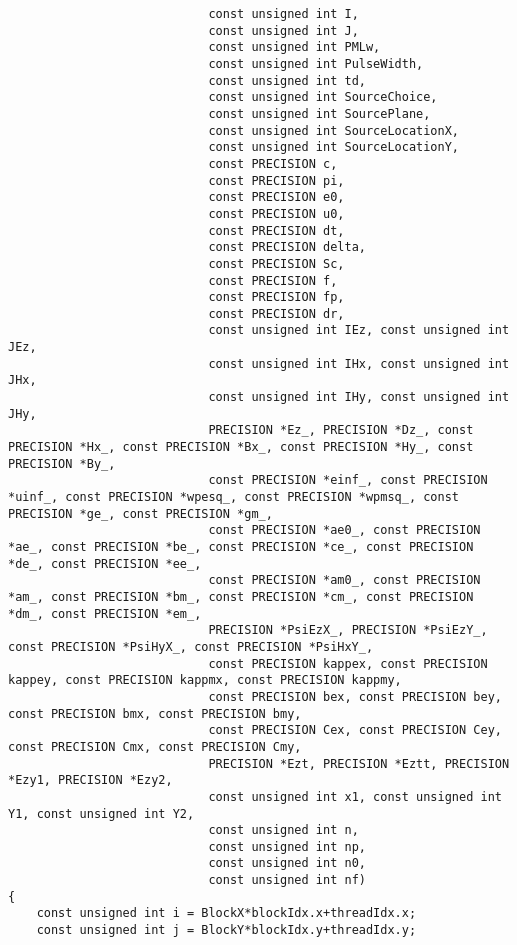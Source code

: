 \begin{lstlisting}
							const unsigned int I,
							const unsigned int J,
							const unsigned int PMLw,
							const unsigned int PulseWidth,
							const unsigned int td,
							const unsigned int SourceChoice,
							const unsigned int SourcePlane,
							const unsigned int SourceLocationX,
							const unsigned int SourceLocationY,
							const PRECISION c,
							const PRECISION pi,
							const PRECISION e0,
							const PRECISION u0,
							const PRECISION dt,
							const PRECISION delta,
							const PRECISION Sc,
							const PRECISION f,
							const PRECISION fp,
							const PRECISION dr,
							const unsigned int IEz, const unsigned int JEz,
							const unsigned int IHx, const unsigned int JHx,
							const unsigned int IHy, const unsigned int JHy,
							PRECISION *Ez_, PRECISION *Dz_, const PRECISION *Hx_, const PRECISION *Bx_, const PRECISION *Hy_, const PRECISION *By_,
							const PRECISION *einf_, const PRECISION *uinf_, const PRECISION *wpesq_, const PRECISION *wpmsq_, const PRECISION *ge_, const PRECISION *gm_,
							const PRECISION *ae0_, const PRECISION *ae_, const PRECISION *be_, const PRECISION *ce_, const PRECISION *de_, const PRECISION *ee_,
							const PRECISION *am0_, const PRECISION *am_, const PRECISION *bm_, const PRECISION *cm_, const PRECISION *dm_, const PRECISION *em_,
							PRECISION *PsiEzX_, PRECISION *PsiEzY_, const PRECISION *PsiHyX_, const PRECISION *PsiHxY_,
							const PRECISION kappex, const PRECISION kappey, const PRECISION kappmx, const PRECISION kappmy,
							const PRECISION bex, const PRECISION bey, const PRECISION bmx, const PRECISION bmy,
							const PRECISION Cex, const PRECISION Cey, const PRECISION Cmx, const PRECISION Cmy,
							PRECISION *Ezt, PRECISION *Eztt, PRECISION *Ezy1, PRECISION *Ezy2,
							const unsigned int x1, const unsigned int Y1, const unsigned int Y2,
							const unsigned int n,
							const unsigned int np,
							const unsigned int n0,
							const unsigned int nf)
{
	const unsigned int i = BlockX*blockIdx.x+threadIdx.x;
	const unsigned int j = BlockY*blockIdx.y+threadIdx.y;


\end{lstlisting}
